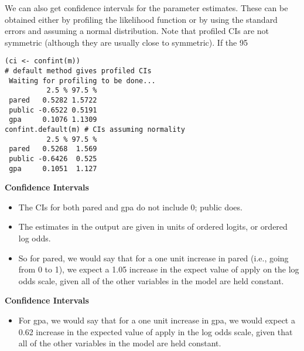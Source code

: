 \documentclass[00-GLMregslides.tex]{subfiles}
\begin{document}
	
\begin{frame}
	\Large
We can also get confidence intervals for the parameter estimates. These can be obtained either by profiling the likelihood function or by using the standard errors and assuming a normal distribution. Note that profiled CIs are not symmetric (although they are usually close to symmetric). If the 95%
\end{frame}
\begin{frame}[fragile]
	\begin{verbatim}
(ci <- confint(m)) 
# default method gives profiled CIs
 Waiting for profiling to be done...
          2.5 % 97.5 %
 pared   0.5282 1.5722
 public -0.6522 0.5191
 gpa     0.1076 1.1309
confint.default(m) # CIs assuming normality
          2.5 % 97.5 %
 pared   0.5268  1.569
 public -0.6426  0.525
 gpa     0.1051  1.127
\end{verbatim}
\end{frame}
\begin{frame}
\textbf{Confidence Intervals}
\begin{itemize}
\item The CIs for both pared and gpa do not include 0; public does. 
\item The estimates in the output are given in units of ordered logits, or ordered log odds. 
\item So for pared, we would say that for a one unit increase in pared (i.e., going from 0 to 1), we expect a 1.05 
increase in the expect value of apply on the log odds scale, given all of the other variables in the model are held constant. 
\end{itemize}
\end{frame}
\begin{frame}
\textbf{Confidence Intervals}
\begin{itemize}
\item For gpa, we would say that for a one unit increase in gpa, we would expect a 0.62 increase in the expected value of 
apply in the log odds scale, given that all of the other variables in the model are held constant.
\end{itemize}
\end{frame}
\end{document}
